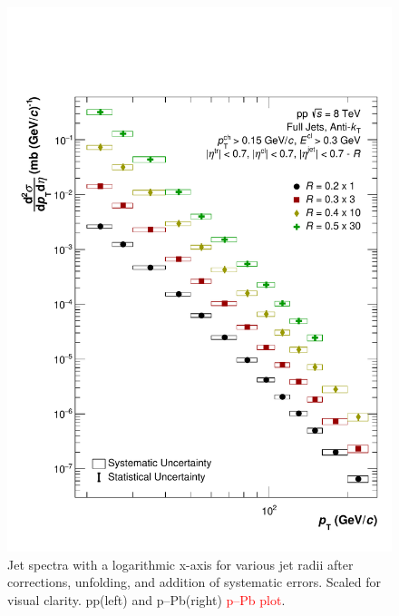 \documentclass[ALICE]{ALICE_analysis_notes}
\newcommand{\pPb}{{\mbox{p--Pb}}\xspace}
\newcommand{\pp}{pp\xspace}
\begin{document}
\begin{figure}
    \centering
    \includegraphics[width=15cm]{figures/FinalResults/Bayes_reg6_logx.pdf}
    \caption{Jet spectra with a logarithmic x-axis for various jet radii after corrections, unfolding, and addition of systematic errors. Scaled for visual clarity. \pp (left) and \pPb (right) \textcolor{red}{\pPb plot}.}
    \label{fig:finalSpectraLogX}
\end{figure}
\end{document}
